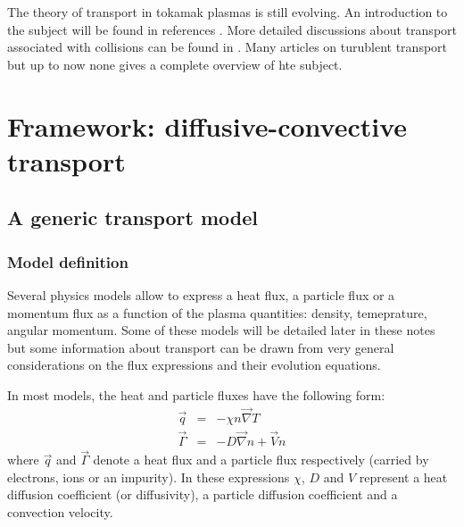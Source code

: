 The theory of transport in tokamak plasmas is still evolving. An introduction to the subject will be found in references \cite{cea1987, wesson2004, chen2006}. More detailed discussions about transport associated with collisions can be found in \cite{hinton1976, hirshman1981, helander2002}. Many articles on turublent transport but up to now none gives a complete overview of hte subject.




		\section{Framework: diffusive-convective transport}
		\label{sec:CadreDeTravail}


		
				\subsection{A generic transport model}
				\label{sub:ModeleGeneriqueDeTransport}
				
						\subsubsection{Model definition}
						\label{subsub:DefinitionDuModele}
						
Several physics models allow to express a heat flux, a particle flux or a momentum flux as a function of the plasma quantities: density, temeprature, angular momentum. Some of these models will be detailed later in these notes but some information about transport can be drawn from very general considerations on the flux expressions and their evolution equations.

In most models, the heat and particle fluxes have the following form:
\begin{eqnarray}
	\vec{q} 			& = & -\chi n \vec{\nabla} T	\\
	\vec{\Gamma} 	& = & -D \vec{\nabla} n + \vec{V} n
\end{eqnarray}
where $\vec{q}$ and $\vec{\Gamma}$ denote a heat flux and a particle flux respectively (carried by electrons, ions or an impurity). In these expressions $\chi$, $D$ and $V$ represent a heat diffusion coefficient (or diffusivity), a particle diffusion coefficient and a convection velocity.

